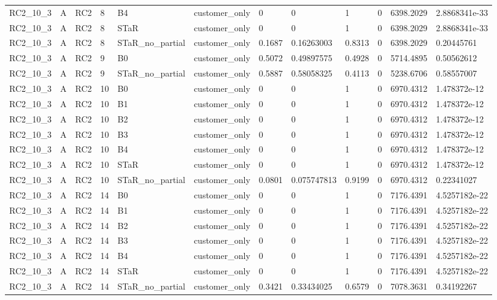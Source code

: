 \begin{longtable}{llllllllllll}
RC2\_10\_3 & A & RC2 & 8 & B4 & customer\_only & 0 & 0 & 1 & 0 & 6398.2029 & 2.8868341e-33 \\
RC2\_10\_3 & A & RC2 & 8 & STaR & customer\_only & 0 & 0 & 1 & 0 & 6398.2029 & 2.8868341e-33 \\
RC2\_10\_3 & A & RC2 & 8 & STaR\_no\_partial & customer\_only & 0.1687 & 0.16263003 & 0.8313 & 0 & 6398.2029 & 0.20445761 \\
RC2\_10\_3 & A & RC2 & 9 & B0 & customer\_only & 0.5072 & 0.49897575 & 0.4928 & 0 & 5714.4895 & 0.50562612 \\
RC2\_10\_3 & A & RC2 & 9 & STaR\_no\_partial & customer\_only & 0.5887 & 0.58058325 & 0.4113 & 0 & 5238.6706 & 0.58557007 \\
RC2\_10\_3 & A & RC2 & 10 & B0 & customer\_only & 0 & 0 & 1 & 0 & 6970.4312 & 1.478372e-12 \\
RC2\_10\_3 & A & RC2 & 10 & B1 & customer\_only & 0 & 0 & 1 & 0 & 6970.4312 & 1.478372e-12 \\
RC2\_10\_3 & A & RC2 & 10 & B2 & customer\_only & 0 & 0 & 1 & 0 & 6970.4312 & 1.478372e-12 \\
RC2\_10\_3 & A & RC2 & 10 & B3 & customer\_only & 0 & 0 & 1 & 0 & 6970.4312 & 1.478372e-12 \\
RC2\_10\_3 & A & RC2 & 10 & B4 & customer\_only & 0 & 0 & 1 & 0 & 6970.4312 & 1.478372e-12 \\
RC2\_10\_3 & A & RC2 & 10 & STaR & customer\_only & 0 & 0 & 1 & 0 & 6970.4312 & 1.478372e-12 \\
RC2\_10\_3 & A & RC2 & 10 & STaR\_no\_partial & customer\_only & 0.0801 & 0.075747813 & 0.9199 & 0 & 6970.4312 & 0.22341027 \\
RC2\_10\_3 & A & RC2 & 14 & B0 & customer\_only & 0 & 0 & 1 & 0 & 7176.4391 & 4.5257182e-22 \\
RC2\_10\_3 & A & RC2 & 14 & B1 & customer\_only & 0 & 0 & 1 & 0 & 7176.4391 & 4.5257182e-22 \\
RC2\_10\_3 & A & RC2 & 14 & B2 & customer\_only & 0 & 0 & 1 & 0 & 7176.4391 & 4.5257182e-22 \\
RC2\_10\_3 & A & RC2 & 14 & B3 & customer\_only & 0 & 0 & 1 & 0 & 7176.4391 & 4.5257182e-22 \\
RC2\_10\_3 & A & RC2 & 14 & B4 & customer\_only & 0 & 0 & 1 & 0 & 7176.4391 & 4.5257182e-22 \\
RC2\_10\_3 & A & RC2 & 14 & STaR & customer\_only & 0 & 0 & 1 & 0 & 7176.4391 & 4.5257182e-22 \\
RC2\_10\_3 & A & RC2 & 14 & STaR\_no\_partial & customer\_only & 0.3421 & 0.33434025 & 0.6579 & 0 & 7078.3631 & 0.34192267 \\

\end{longtable}
